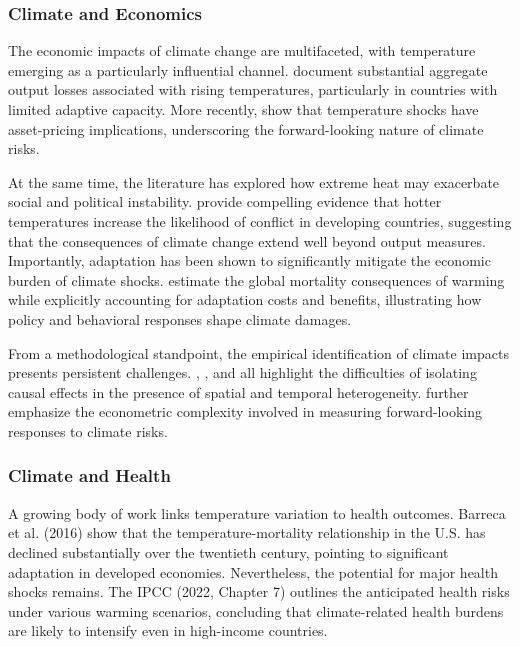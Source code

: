\documentclass{article}
\begin{document}
\subsubsection{Climate and Economics}

The economic impacts of climate change are multifaceted, with temperature emerging as a particularly influential channel.
\citep{Burke_et_al_2015} document substantial aggregate output losses associated with rising temperatures, particularly in countries with limited adaptive capacity.
More recently, \citep{Bilal_Kanzig_2024} show that temperature shocks have asset-pricing implications, underscoring the forward-looking nature of climate risks.

At the same time, the literature has explored how extreme heat may exacerbate social and political instability.
\citep{doi:10.1126/science.1235367} provide compelling evidence that hotter temperatures increase the likelihood of conflict in developing countries, suggesting that the consequences of climate change extend well beyond output measures.
Importantly, adaptation has been shown to significantly mitigate the economic burden of climate shocks. 
\citep{Carleton_et_al_2022} estimate the global mortality consequences of warming while explicitly accounting for adaptation costs and benefits, illustrating how policy and behavioral responses shape climate damages.

From a methodological standpoint, the empirical identification of climate impacts presents persistent challenges.
\citep{Deryugina_Hsiang_2017}, \citep{Hsiang_2016},
and \citep{Nordhaus_2019} all highlight the difficulties of isolating causal effects in the presence of spatial and temporal heterogeneity.
\citep{Bilal_Kanzig_2024} further emphasize the econometric complexity involved in measuring forward-looking responses to climate risks.

\subsubsection{Climate and Health}

A growing body of work links temperature variation to health outcomes. Barreca et al. (2016) show that the temperature-mortality relationship in the U.S. has declined substantially over the twentieth century, pointing to significant adaptation in developed economies. Nevertheless, the potential for major health shocks remains. The IPCC (2022, Chapter 7) outlines the anticipated health risks under various warming scenarios, concluding that climate-related health burdens are likely to intensify even in high-income countries.
\end{document}

